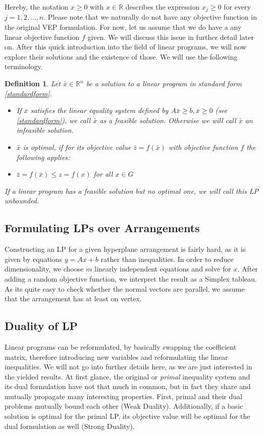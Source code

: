 \documentclass[a4paper, 11pt]{article}
\makeatletter
\newtheorem{mydef}{Definition}
\renewenvironment{quotation}
{\list{}{\listparindent=1.5em
		\itemindent=0pt
		\parsep\z@ \@plus\p@}%
	\item\relax}
{\endlist}
\makeatother
\begin{document}
Hereby, the notation $x\geq0$ with $x\in \mathbb{R}$ describes the expression $x_j\geq 0$ for every $j=1,2,\dots,n$.\medskip 
Please note that we naturally do not have any objective function in the original VEP formulation. For now, let us assume that we do have a any linear objective function $f$ given. We will discuss this issue in further detail later on.\medskip
After this quick introduction into the field of linear programs, we will now explore their solutions and the existence of those. We will use the following terminology.

\begin{mydef}
	Let $\bar{x} \in \mathbb{R}^n$ be a solution to a linear program in standard form \ref{standardform}.\medskip
	\begin{itemize}
		\item[(1)] If $\bar{x}$ satisfies the linear equality system defined by $A\bar{x}\geq b, \bar{x}\geq 0$ (see \ref{standardform}), we call $\bar{x}$ as a \emph{feasible solution}. Otherwise we will call $\bar{x}$ an infeasible solution.
		\item[(2)] $\bar{x}$ is \emph{optimal}, if for its objective value $\bar{z} = f(\bar{x})$ with objective function $f$ the following applies:
		\begin{quotation}
			$\bar{z} = f(\bar{x}) \leq z = f(x)$ for all $x\in G$
		\end{quotation}
	\end{itemize}
	If a linear program has a feasible solution but no optimal one, we will call this LP unbounded.
\end{mydef}

\subsection{Formulating LPs over Arrangements}
Constructing an LP for a given hyperplane arrangement is fairly hard, as it is given by equations $y=Ax + b$ rather than inequalities. In order to reduce dimensionality, we choose $m$ linearly independent equations and solve for $x$. After adding a random objective function, we interpret the result as a Simplex tableau. As its quite easy to check whether the normal vectors are parallel, we assume that the arrangement has at least on vertex.


\subsection{Duality of LP}
Linear programs can be reformulated, by basically \glqq swapping\grqq{} the coefficient matrix, therefore introducing new variables and reformulating the linear inequalities. We will not go into further details here, as we are just interested in the yielded results. At first glance, the original or \textit{primal} inequality system and its dual formulation have not that much in common, but in fact they share and mutually propagate many interesting properties. First, primal and their dual problems mutually bound each other (Weak Duality). Additionally, if a basic solution is optimal for the primal LP, its objective value will be optimal for the dual formulation as well (Strong Duality).
\end{document}
